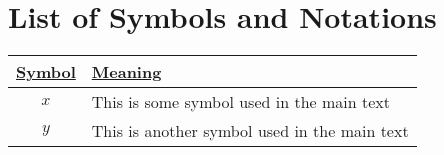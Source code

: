 \chapter*{List of Symbols and Notations}
\label{symbols_list}


\begin{longtable}{cp{}}
  \underline{\textbf{Symbol}} & \underline{\textbf{Meaning}}\\
  \endhead
  $x$ & This is some symbol used in the main text \\
  $y$ & This is another symbol used in the main text 
\end{longtable}